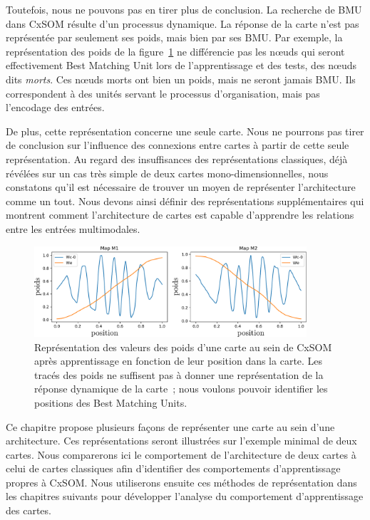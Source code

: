 \documentclass[../main]{subfiles}
\begin{document}
Toutefois, nous ne pouvons pas en tirer plus de conclusion.
La recherche de BMU dans CxSOM résulte d'un processus dynamique. La réponse de la carte n'est pas représentée par seulement ses poids, mais bien par ses BMU.
Par exemple, la représentation des poids de la figure~\ref{fig:weights} ne différencie pas les n\oe{}uds qui seront effectivement Best Matching Unit lors de l'apprentissage et des tests, des n\oe{}uds dits \emph{morts}.
Ces n\oe{}uds morts ont bien un poids, mais ne seront jamais BMU. Ils correspondent à des unités servant le processus d'organisation, mais pas l'encodage des entrées.

De plus, cette représentation concerne une seule carte. Nous ne pourrons pas tirer de conclusion sur l'influence des connexions entre cartes à partir de cette seule représentation.
Au regard des insuffisances des représentations classiques, déjà révélées sur un cas très simple de deux cartes mono-dimensionnelles, nous constatons qu'il est nécessaire de trouver un moyen de représenter l'architecture comme un tout. 
Nous devons ainsi définir des représentations supplémentaires qui montrent comment l'architecture de cartes est capable d'apprendre les relations entre les entrées multimodales.

\begin{figure}
\centering
\includegraphics[width=0.9\textwidth]{weights_cercle1.pdf}
\caption{Représentation des valeurs des poids d'une carte au sein de CxSOM après apprentissage en fonction de leur position dans la carte. Les tracés des poids ne suffisent pas à donner une représentation de la réponse dynamique de la carte~; nous voulons pouvoir identifier les positions des Best Matching Units. \label{fig:weights}}
\end{figure}

Ce chapitre propose plusieurs façons de représenter une carte au sein d'une architecture.
Ces représentations seront illustrées sur l'exemple minimal de deux cartes.
Nous comparerons ici le comportement de l'architecture de deux cartes à celui de cartes classiques afin d'identifier des comportements d'apprentissage propres à CxSOM.
Nous utiliserons ensuite ces méthodes de représentation dans les chapitres suivants pour développer l'analyse du comportement d'apprentissage des cartes.
\end{document}
